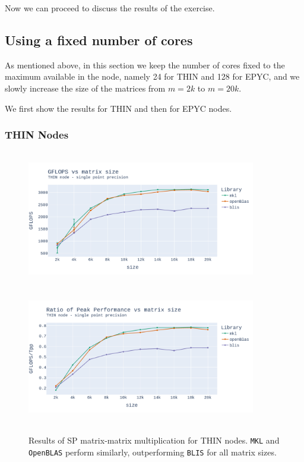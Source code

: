 \documentclass{report}
\begin{document}
Now we can proceed to discuss the results of the exercise.

\subsection{Using a fixed number of cores}

As mentioned above, in this section we keep the number of cores fixed to the 
maximum available in the node, namely 24 for THIN and 128 for EPYC, and we 
slowly increase the size of the matrices from $m=2k$ to $m=20k$. 

We first show the results for THIN and then for EPYC nodes.

\subsubsection{THIN Nodes}

\begin{figure}[H]
\hspace*{-2.5cm}
\includegraphics[width=10cm, height=6cm]{./images/fixed_cores_thin_float_gflops.pdf}
\includegraphics[width=10cm, height=6cm]{./images/fixed_cores_thin_float_gflops_ratio.pdf}
\caption{\label{fig:fixed_cores_thin_float} Results of SP matrix-matrix multiplication 
for THIN nodes. \texttt{MKL} and \texttt{OpenBLAS} perform similarly, outperforming 
\texttt{BLIS} for all matrix sizes.}
\end{figure}
\end{document}
